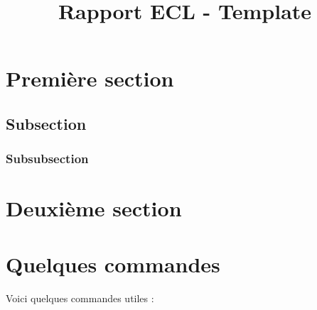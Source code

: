\documentclass{rapportECC}
\title{Rapport ECL - Template} %
\begin{document}





        
\fairemarges %
\fairepagedegarde %
\tabledematieres %



\section{Première section} 

\lipsum[3-4]%

\subsection{Subsection}


\lipsum[3-4] %
\subsubsection{Subsubsection}
\lipsum[1-2]
\section{Deuxième section}

\lipsum[3-5] %


\section{Quelques commandes}

Voici quelques commandes utiles : \cite{Lamport}

\end{document}
